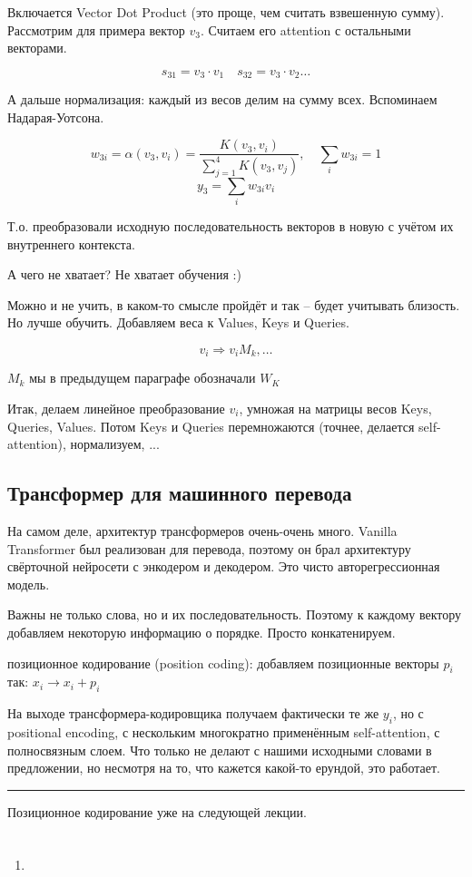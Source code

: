 \documentclass[a4paper,12pt]{article}
\begin{document}
Включается Vector Dot Product (это проще, чем считать взвешенную сумму).
Рассмотрим для примера вектор $ v_3 $.
Считаем его attention с остальными векторами.

\[
s_{31} = v_3 \cdot v_1 \quad %
s_{32} = v_3 \cdot v_2
\dots 
\]

А дальше нормализация: каждый из весов делим на сумму всех.
Вспоминаем Надарая-Уотсона.

\[ w_{3i} = \alpha (v_3, v_i) = \frac{K(v_3, v_i)}{\sum_{j=1}^4 K(v_3, v_j)}, \quad \sum_i w_{3i} = 1 \]
\[ y_3 = \sum_i w_{3i} v_i \]

Т.о. преобразовали исходную последовательность векторов в новую с учётом их внутреннего контекста.

А чего не хватает?
Не хватает обучения :)

Можно и не учить, в каком-то смысле пройдёт и так -- будет учитывать близость.
Но лучше обучить.
Добавляем веса к Values, Keys и Queries.

\[ v_i \Rightarrow v_i M_k,  \dots \]

$ M_k $ мы в предыдущем параграфе обозначали $ W_K $

Итак, делаем линейное преобразование $ v_i $, умножая на матрицы весов Keys, Queries, Values.
Потом Keys и Queries перемножаются (точнее, делается self-attention), нормализуем, ...

\subsection{Трансформер для машинного перевода}

На самом деле, архитектур трансформеров очень-очень много.
Vanilla Transformer был реализован для перевода, поэтому он брал архитектуру свёрточной нейросети с энкодером и декодером.
Это чисто авторегрессионная модель.

Важны не только слова, но и их последовательность.
Поэтому к каждому вектору добавляем некоторую информацию о порядке.
Просто конкатенируем.

позиционное кодирование (position coding): добавляем позиционные векторы $ p_i $ так: $ x_i \to x_i + p_i $

На выходе трансформера-кодировщика получаем фактически те же $ y_i $, но с positional encoding, с нескольким многократно применённым self-attention, с полносвязным слоем.
Что только не делают с нашими исходными словами в предложении, но несмотря на то, что кажется какой-то ерундой, это работает.

\hrule

Позиционное кодирование уже на следующей лекции.

\section{}
\subsection{}

\begin{enumerate}[noitemsep]
	\item 
\end{enumerate}
	
	
\end{document}

